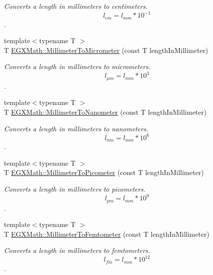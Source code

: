 \begin{DoxyCompactItemize}
\begin{DoxyCompactList}\small\item\em Converts a length in millimeters to centimeters. \[ l_{cm}=l_{mm} * 10^{-1} \]. \end{DoxyCompactList}\item 
{\footnotesize template$<$typename T $>$ }\\T \mbox{\hyperlink{group___e_g_x_math-_conversions-_length_conversions-_millimeter-_s_i_gadec5d89ecdd6bfe638f54ceffe0e0630}{E\+G\+X\+Math\+::\+Millimeter\+To\+Micrometer}} (const T length\+In\+Millimeter)
\begin{DoxyCompactList}\small\item\em Converts a length in millimeters to micrometers. \[ l_{\mu m}=l_{mm} * 10^{3} \]. \end{DoxyCompactList}\item 
{\footnotesize template$<$typename T $>$ }\\T \mbox{\hyperlink{group___e_g_x_math-_conversions-_length_conversions-_millimeter-_s_i_ga4ed79a00a348e87b09e55e34d852841c}{E\+G\+X\+Math\+::\+Millimeter\+To\+Nanometer}} (const T length\+In\+Millimeter)
\begin{DoxyCompactList}\small\item\em Converts a length in millimeters to nanometers. \[ l_{nm}=l_{mm} * 10^{6} \]. \end{DoxyCompactList}\item 
{\footnotesize template$<$typename T $>$ }\\T \mbox{\hyperlink{group___e_g_x_math-_conversions-_length_conversions-_millimeter-_s_i_ga679e3714c229f1355a5c9bf707fcd723}{E\+G\+X\+Math\+::\+Millimeter\+To\+Picometer}} (const T length\+In\+Millimeter)
\begin{DoxyCompactList}\small\item\em Converts a length in millimeters to picometers. \[ l_{pm}=l_{mm} * 10^{9} \]. \end{DoxyCompactList}\item 
{\footnotesize template$<$typename T $>$ }\\T \mbox{\hyperlink{group___e_g_x_math-_conversions-_length_conversions-_millimeter-_s_i_gaa6dd55424b685e10484ca46e394b2e92}{E\+G\+X\+Math\+::\+Millimeter\+To\+Femtometer}} (const T length\+In\+Millimeter)
\begin{DoxyCompactList}\small\item\em Converts a length in millimeters to femtometers. \[ l_{fm}=l_{mm} * 10^{12} \]. \end{DoxyCompactList}\item 

\end{DoxyCompactItemize}
